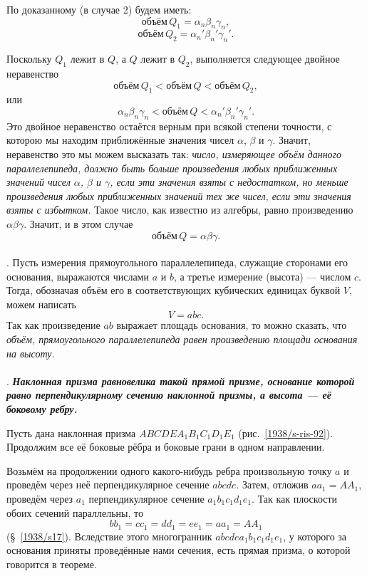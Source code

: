 По доказанному (в случае 2) будем иметь:
\[\text{объём}\, Q_1 = \alpha_n\beta_n\gamma_n, \]
\[\text{объём}\, Q_2 = \alpha_n'\beta_n'\gamma_n'.\]

Поскольку $Q_1$ лежит в $Q$, а $Q$ лежит в $Q_2$, выполняется следующее двойное неравенство
\[\text{объём}\, Q_1 < \text{объём}\, Q <\text{объём}\, Q_2,\]
или 
\[\alpha_n\beta_n\gamma_n < \text{объём}\, Q <\alpha_n'\beta_n'\gamma_n'.\]
Это двойное неравенство остаётся верным при всякой степени точности, с которою мы находим приближённые значения чисел $\alpha$, $\beta$ и $\gamma$.
Значит, неравенство это мы можем высказать так: \emph{число, измеряющее объём данного параллелепипеда, должно быть больше произведения любых приближенных значений чисел $\alpha$, $\beta$ и $\gamma$, если эти значения взяты с недостатком, но меньше произведения любых приближенных значений тех же чисел, если эти значения взяты с избытком.}
Такое число, как известно из алгебры, равно произведению $\alpha\beta\gamma$.
Значит, и в этом случае
\[\text{объём}\, Q=\alpha\beta\gamma.\]

\paragraph{}\label{1938/s85}
.
Пусть измерения прямоугольного параллелепипеда, служащие сторонами его основания, выражаются числами $a$ и $b$, а третье измерение (высота) — числом $c$.
Тогда, обозначая объём его в соответствующих кубических единицах буквой $V$, можем написать
\[V = abc.\]
Так как произведение $ab$ выражает площадь основания, то можно сказать, что \emph{объём, прямоугольного параллелепипеда равен произведению площади основания на высоту.}

\paragraph{}\label{1938/s86}
.
\textbf{\emph{Наклонная призма равновелика такой прямой призме, основание которой равно перпендикулярному сечению наклонной призмы, а высота — её боковому ребру.}}

Пусть дана наклонная призма $ABCDEA_1B_1C_1D_1E_1$ (рис.~\ref{1938/s-ris-92}).
Продолжим все её боковые рёбра и боковые грани в одном направлении.

Возьмём на продолжении одного какого-нибудь ребра произвольную точку $a$ и проведём через неё перпендикулярное сечение $abcde$.
Затем, отложив $aa_1=AA_1$, проведём через $a_1$ перпендикулярное сечение $a_1b_1c_1d_1e_1$.
Так как плоскости обоих сечений параллельны, то 
\[bb_1=cc_1=dd_1=ee_1=aa_1=AA_1\]
(§~\ref{1938/s17}).
Вследствие этого многогранник $abcdea_1b_1c_1d_1e_1$, у которого за основания приняты проведённые нами сечения, есть прямая призма, о которой говорится в теореме.

